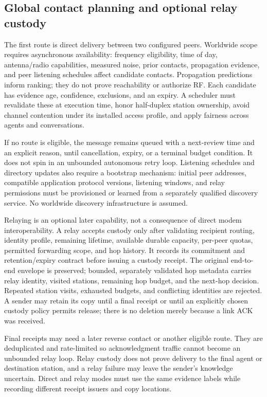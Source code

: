 \subsection{Global contact planning and optional relay custody}
The first route is direct delivery between two configured peers. Worldwide
scope requires asynchronous availability: frequency eligibility, time of day,
antenna/radio capabilities, measured noise, prior contacts, propagation
evidence, and peer listening schedules affect candidate contacts. Propagation
predictions inform ranking; they do not prove reachability or authorize RF.
Each candidate has evidence age, confidence, exclusions, and an expiry. A
scheduler must revalidate these at execution time, honor half-duplex station
ownership, avoid channel contention under its installed access profile, and
apply fairness across agents and conversations.

If no route is eligible, the message remains queued with a next-review time
and an explicit reason, until cancellation, expiry, or a terminal budget
condition. It does not spin in an unbounded autonomous retry loop. Listening
schedules and directory updates also require a bootstrap mechanism: initial
peer addresses, compatible application protocol versions, listening windows,
and relay permissions must be provisioned or learned from a separately
qualified discovery service. No worldwide discovery infrastructure is assumed.

Relaying is an optional later capability, not a consequence of direct modem
interoperability. A relay accepts custody only after validating recipient
routing, identity profile, remaining lifetime, available durable capacity,
per-peer quotas, permitted forwarding scope, and hop history. It records its
commitment and retention/expiry contract before issuing a custody receipt.
The original end-to-end envelope is preserved; bounded, separately validated
hop metadata carries relay identity, visited stations, remaining hop budget,
and the next-hop decision. Repeated station visits, exhausted budgets, and
conflicting identities are rejected. A sender may retain its copy until a
final receipt or until an explicitly chosen custody policy permits release;
there is no deletion merely because a link ACK was received.

Final receipts may need a later reverse contact or another eligible route.
They are deduplicated and rate-limited so acknowledgment traffic cannot become
an unbounded relay loop. Relay custody does not prove delivery to the final
agent or destination station, and a relay failure may leave the sender's
knowledge uncertain. Direct and relay modes must use the same evidence labels
while recording different receipt issuers and copy locations.

